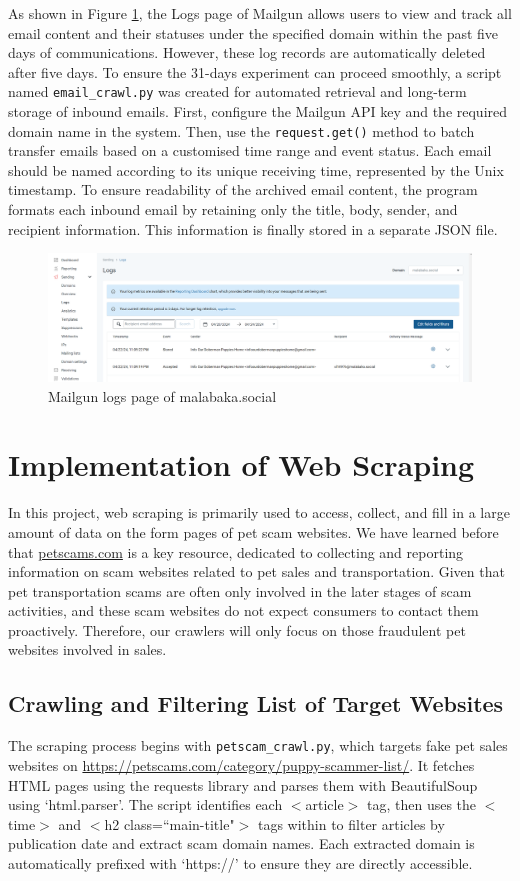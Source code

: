 \documentclass[ oneside,%
                    author={Cassie Qing Tang},
                    degree={BSc},
                     title={An Automated Response System for Disrupting Online Pet Scamming \\ },
                    subtitle={ }]{dissertation}
\begin{document}
As shown in Figure \ref{fig:pic4}, the Logs page of Mailgun allows users to view and track all email content and their statuses under the specified domain within the past five days of communications. However, these log records are automatically deleted after five days. To ensure the 31-days experiment can proceed smoothly, a script named \texttt{email\_crawl.py} was created for automated retrieval and long-term storage of inbound emails. First, configure the Mailgun API key and the required domain name in the system. Then, use the \texttt{request.get()} method to batch transfer emails based on a customised time range and event status. Each email should be named according to its unique receiving time, represented by the Unix timestamp. To ensure readability of the archived email content, the program formats each inbound email by retaining only the title, body, sender, and recipient information. This information is finally stored in a separate JSON file.
\begin{figure}[H]
\centering
\includegraphics[width=0.95\linewidth,height=0.2\textheight]{pic/figure4.png}
\caption{Mailgun logs page of malabaka.social}
\label{fig:pic4}
\end{figure}


\section{Implementation of Web Scraping}
In this project, web scraping is primarily used to access, collect, and fill in a large amount of data on the form pages of pet scam websites. We have learned before that \href{www.petscams.com}{petscams.com} is a key resource, dedicated to collecting and reporting information on scam websites related to pet sales and transportation. Given that pet transportation scams are often only involved in the later stages of scam activities, and these scam websites do not expect consumers to contact them proactively. Therefore, our crawlers will only focus on those fraudulent pet websites involved in sales.

\subsection{Crawling and Filtering List of Target Websites}
The scraping process begins with \texttt{petscam\_crawl.py}, which targets fake pet sales websites on \url{https://petscams.com/category/puppy-scammer-list/}. It fetches HTML pages using the requests library and parses them with BeautifulSoup using `html.parser'. The script identifies each $<$article$>$ tag, then uses the $<$time$>$ and $<$h2 class=``main-title"$>$ tags within to filter articles by publication date and extract scam domain names.  Each extracted domain is automatically prefixed with `https://' to ensure they are directly accessible.
\\
\end{document}
